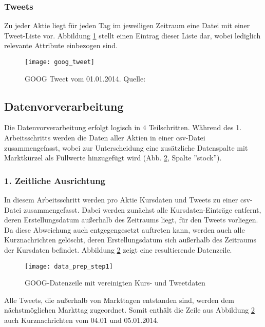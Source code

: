 \subsubsection*{Tweets}\label{sec:data_ingestion_tweetdata}
Zu jeder Aktie liegt für jeden Tag im jeweiligen Zeitraum eine Datei mit einer Tweet-Liste vor. Abbildung \ref{fig:goog_tweet} stellt einen Eintrag dieser Liste dar, wobei lediglich relevante Attribute einbezogen sind.
\begin{figure}[H]
	\texttt{[image: goog\_tweet]}
	\caption[GOOG Tweet vom 01.01.2014]{GOOG Tweet vom 01.01.2014. Quelle: \autocite{website:stocknet-dataset}}
	\label{fig:goog_tweet}
\end{figure}


\subsection{Datenvorverarbeitung}\label{sec:data_prep}

Die Datenvorverarbeitung erfolgt logisch in $4$ Teilschritten. Während des 1. Arbeitsschritts werden die Daten aller Aktien in einer \ac{csv}-Datei zusammengefasst, wobei zur Unterscheidung eine zusätzliche Datenspalte mit Marktkürzel als Füllwerte hinzugefügt wird (Abb. \ref{fig:data_prep_step1}, Spalte ''stock'').

\subsubsection*{1. Zeitliche Ausrichtung}

In diesem Arbeitsschritt werden pro Aktie Kursdaten und Tweets zu einer \ac{csv}-Datei zusammengefasst. Dabei werden zunächst alle Kursdaten-Einträge entfernt, deren Erstellungsdatum außerhalb des Zeitraums liegt, für den Tweets vorliegen. Da diese Abweichung auch entgegengesetzt auftreten kann, werden auch alle Kurznachrichten gelöscht, deren Erstellungsdatum sich außerhalb des Zeitraums der Kursdaten befindet. Abbildung \ref{fig:data_prep_step1} zeigt eine resultierende Datenzeile.
\begin{figure}[H]
	\texttt{[image: data\_prep\_step1]}
	\caption{GOOG-Datenzeile mit vereinigten Kurs- und Tweetdaten}
	\label{fig:data_prep_step1}
\end{figure}
Alle Tweets, die außerhalb von Markttagen entstanden sind, werden dem nächstmöglichen Markttag zugeordnet. Somit enthält die Zeile aus Abbildung \ref{fig:data_prep_step1} auch Kurznachrichten vom 04.01 und 05.01.2014. 


